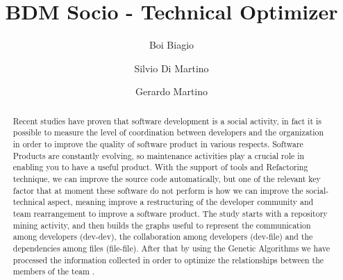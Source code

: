 \documentclass[sigconf]{acmart}
\begin{document}
\title{BDM Socio - Technical Optimizer}


\author{Boi Biagio}

\author{Silvio Di Martino}

\author{Gerardo Martino}

\renewcommand{\shortauthors}{}

\begin{abstract}
Recent studies have proven that software development is a social activity, in fact it is possible to measure the level of coordination between developers and the organization in order to improve the quality of software product in various respects. Software Products are constantly evolving, so maintenance activities play a crucial role in enabling you to have a useful product. With the support of tools and Refactoring technique, we can improve the source code automatically, but one of the relevant key factor that at moment these software do not perform is how we can improve the social-technical aspect, meaning improve a restructuring of the developer community and team rearrangement to improve a software product. The study starts with a repository mining activity, and then builds the graphs useful to represent the communication among developers (dev-dev), the collaboration among developers (dev-file) and the dependencies among files (file-file). After that by using the Genetic Algorithms we have processed the information collected in order to optimize the relationships between the members of the team \cite{palomba1}.
\end{abstract}
\end{document}
